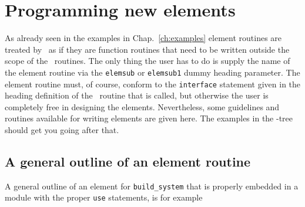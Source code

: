 \newpage
\section{Programming new elements}

As already seen in the examples in Chap.~\ref{ch:examples} element routines are
treated by \tfem\ as if they are function routines that need to be written
outside the scope of the \tfem\ routines. The only thing the user has to do is
supply the name of the element routine via the \texttt{elemsub} or
\texttt{elemsub1} dummy heading parameter. The element routine must, of course,
conform to the \texttt{interface}
statement given in the heading definition of the \tfem\ routine that is called,
but otherwise the user is completely free in designing the elements.
Nevertheless, some guidelines and routines available for writing elements are
given here. The examples in the \tfem-tree should get you going after that.

\subsection{A general outline of an element routine}

A general outline of an element for \texttt{build\_system} that is properly
embedded in a module with the proper \texttt{use} statements, is for example

